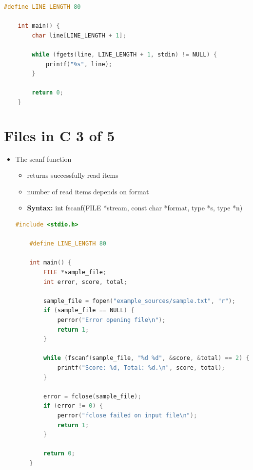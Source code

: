 \documentclass[12pt]{article}
\begin{document}
\begin{itemize}
\begin{lstlisting}[language=c]
    #define LINE_LENGTH 80

    int main() {
        char line[LINE_LENGTH + 1];

        while (fgets(line, LINE_LENGTH + 1, stdin) != NULL) {
            printf("%s", line);
        }

        return 0;
    }
    \end{lstlisting}
\end{itemize}

\bigskip

\section*{Files in C 3 of 5}

\bigskip

\begin{itemize}
    \item The scanf function
    \begin{itemize}
        \item returns successfully read items
        \item number of read items depends on format
        \item \textbf{Syntax:} int fscanf(FILE *stream, const char *format, type *s,  type *n)
    \end{itemize}

    \begin{lstlisting}[language=c]
    #include <stdio.h>

    #define LINE_LENGTH 80

    int main() {
        FILE *sample_file;
        int error, score, total;

        sample_file = fopen("example_sources/sample.txt", "r");
        if (sample_file == NULL) {
            perror("Error opening file\n");
            return 1;
        }

        while (fscanf(sample_file, "%d %d", &score, &total) == 2) { //<- ==2 means each fscan must return 2 values, one for each col.
            printf("Score: %d, Total: %d.\n", score, total);
        }

        error = fclose(sample_file);
        if (error != 0) {
            perror("fclose failed on input file\n");
            return 1;
        }

        return 0;
    }
    \end{lstlisting}
\end{itemize}

\bigskip
\end{document}

